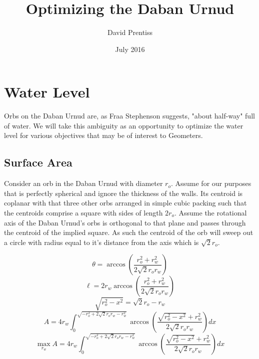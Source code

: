 \documentclass{amsart}
\title{Optimizing the Daban Urnud}
\author{David Prentiss}
\date{July 2016}
\begin{document}
\maketitle

\section{Water Level}

Orbs on the Daban Urnud are, as Fraa Stephenson suggests, "about half-way" full of water.
We will take this ambiguity as an opportunity to optimize the water level for various objectives that may be of interest to Geometers. 

\subsection{Surface Area}

Consider an orb in the Daban Urnud with diameter $r_o$.
Assume for our purposes that is perfectly spherical and ignore the thickness of the walls.
Its centroid is coplanar with that three other orbs arranged in simple cubic packing such that the centroids comprise a square with sides of length $2r_o$. 
Assume the rotational axis of the Daban Urnud's orbs is orthogonal to that plane and passes through the centroid of the implied square.
As such the centroid of the orb will sweep out a circle with radius equal to it's distance from the axis which is $\sqrt{2}r_o$.




\[
    \theta = \arccos \left(\frac{r_o^2+r_w^2}{2 \sqrt{2} r_o r_w}\right)
    \]
\[
    \ell = 2 r_w\arccos \left(\frac{r_o^2+r_w^2}{2 \sqrt{2} r_o r_w}\right)
    \]
\[
    \sqrt{r_o^2-x^2} = \sqrt{2}r_o - r_w
    \]
\[
    A = 4 r_w \int_0^{\sqrt{-r_o^2+2\sqrt{2}r_o r_w-r_w^2}} \arccos \left(\frac{\sqrt{r_o^2-x^2}+r_w^2}{2 \sqrt{2} r_o r_w}\right) dx
    \]
\[
    \max_{r_w} A = 4 r_w \int_0^{\sqrt{-r_o^2+2\sqrt{2}r_o r_w-r_w^2}} \arccos \left(\frac{\sqrt{r_o^2-x^2}+r_w^2}{2 \sqrt{2} r_o r_w}\right) dx
    \]
    
\end{document}
